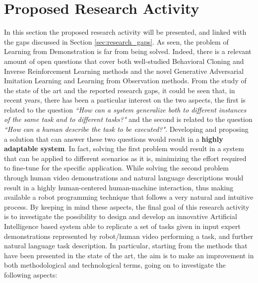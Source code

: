 \section{Proposed Research Activity}
\label{sec:research_activity}
In this section the proposed research activity will be presented, and linked with the gaps discussed in Section \ref{sec:research_gaps}. 
\newline As seen, the problem of Learning from Demonstration is far from being solved. Indeed, there is a relevant amount of open questions that cover both well-studied Behavioral Cloning and Inverse Reinforcement Learning methods and the novel Generative Adversarial Imitation Learning and Learning from Observation methods. 
From the study of the state of the art and the reported research gaps, it could be seen that, in recent years, there has been a particular interest on the two aspects,  
the first is related to the question \textit{``How can a system generalize both to different instances of the same task and to different tasks?"} and the second is related to the question \textit{``How can a human describe the task to be executed?"}. Developing and proposing a solution that can answer these two questions would result in a \textbf{highly adaptable system}. In fact, solving the first problem would result in a system that can be applied to different scenarios as it is, minimizing the effort required to fine-tune for the specific application. While solving the second problem through human video demonstrations and natural language descriptions would result in a highly human-centered human-machine interaction, thus making available a robot programming technique that follows a very natural and intuitive process. By keeping in mind these aspects, the final goal of this research activity is to investigate the possibility to design and develop an innovative Artificial Intelligence based system able to replicate a set of tasks given in input expert demonstrations represented by robot/human video performing a task, and further natural language task description. In particular, starting from the methods that have been presented in the state of the art, the aim is to make an improvement in both methodological and technological terms, going on to investigate the following aspects:

